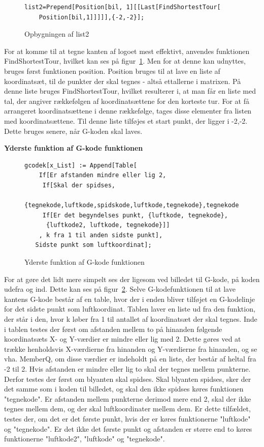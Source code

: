 \begin{figure}[h]
	\begin{lstlisting}
list2=Prepend[Position[bil, 1][[Last[FindShortestTour[
	Position[bil,1]]]]],{-2,-2}];
 \end{lstlisting}
	\caption{Opbygningen af list2}
	\label{fig:list2}
	\end{figure}
For at komme til at tegne kanten af logoet mest effektivt, anvendes funktionen FindShortestTour, hvilket kan ses på figur~\ref{fig:list2}. Men for at denne kan udnyttes, bruges først funktionen position. Position bruges til at lave en liste af koordinatsæt, til de punkter der skal tegnes - altså ettallerne i matrixen. På denne liste bruges FindShortestTour, hvilket resulterer i, at man får en liste med tal, der angiver rækkefølgen af koordinatsættene for den korteste tur. For at få arrangeret koordinatsættene i denne rækkefølge, tages disse elementer fra listen med koordinatsættene. Til denne liste tilføjes et start punkt, der ligger i -2,-2. Dette bruges senere, når G-koden skal laves.

\textbf{Yderste funktion af G-kode funktionen}\\
\begin{figure}[h]
	\begin{lstlisting}
gcodek[x_List] := Append[Table[
    If[Er afstanden mindre eller lig 2,
     If[Skal der spidses,
      {tegnekode,luftkode,spidskode,luftkode,tegnekode},tegnekode],
     If[Er det begyndelses punkt, {luftkode, tegnekode},
      {luftkode2, luftkode, tegnekode}]]
    , k fra 1 til anden sidste punkt], 
   Sidste punkt som luftkoordinat];
 \end{lstlisting}
	\caption{Yderste funktion af G-kode funktionen}
	\label{fig:ydrefunk}
	\end{figure}
For at gøre det lidt mere simpelt ses der ligesom ved billedet til G-kode, på koden udefra og ind. Dette kan ses på figur~\ref{fig:ydrefunk}. Selve G-kodefunktionen til at lave kantens G-kode består af en table, hvor der i enden bliver tilføjet en G-kodelinje for det sidste punkt som luftkoordinat. Tablen laver en liste ud fra den funktion, der står i den, hvor k løber fra 1 til antallet af koordinatsæt der skal tegnes. Inde i tablen testes der først om afstanden mellem to på hinanden følgende koordinatsæts X- og Y-værdier er mindre eller lig med 2. Dette gøres ved at trække henholdsvis X-værdierne fra hinanden og Y-værdierne fra hinanden, og se vha. MemberQ, om disse værdier er indeholdt på en liste, der består af heltal fra -2 til 2. Hvis afstanden er mindre eller lig to skal der tegnes mellem punkterne. Derfor testes der først om blyanten skal spidses. Skal blyanten spidses, sker der det samme som i koden til billedet, og skal den ikke spidses køres funktionen "tegnekode". Er afstanden mellem punkterne derimod mere end 2, skal der ikke tegnes mellem dem, og der skal luftkoordinater mellem dem. Er dette tilfældet, testes der, om det er det første punkt, hvis der er køres funktionerne "luftkode" og "tegnekode". Er det ikke det første punkt og afstanden er større end to køres funktionerne "luftkode2", "luftkode" og "tegnekode".

